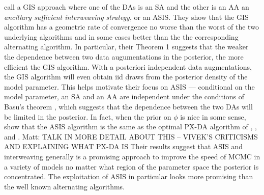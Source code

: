 \documentclass{article}
\newcommand{\matt}[1]{{\color{red} Matt: #1}}
\begin{document}
 call a GIS approach where one of the DAs is an SA and the other is an AA an {\it ancillary sufficient interweaving strategy}, or an ASIS. They show that the GIS algorithm has a geometric rate of convergence no worse than the worst of the two underlying algorithms and in some cases better than the the corresponding alternating algorithm. In particular, their Theorem 1 suggests that the weaker the dependence between two data augumentations in the posterior, the more efficient the GIS algorithm. With a posteriori independent data augmentations, the GIS algorithm will even obtain iid draws from the posterior density of the model parameter. This helps motivate their focus on ASIS --- conditional on the model parameter, an SA and an AA are independent under the conditions of Basu's theorem \cite{basu1955statistics}, which suggests that the dependence between the two DAs will be limited in the posterior. In fact, when the prior on $\phi$ is nice in some sense,  show that the ASIS algorithm is the same as the optimal PX-DA algorithm of , ,  and . \matt{TALK IN MORE DETAIL ABOUT THIS -- VIVEK'S CRITICISMS AND EXPLAINING WHAT PX-DA IS} Their results suggest that ASIS and interweaving generally is a promising approach to improve the speed of MCMC in a variety of models no matter what region of the parameter space the posterior is concentrated. The exploitation of ASIS in particular looks more promising than the well known alternating algorithms.
\end{document}
